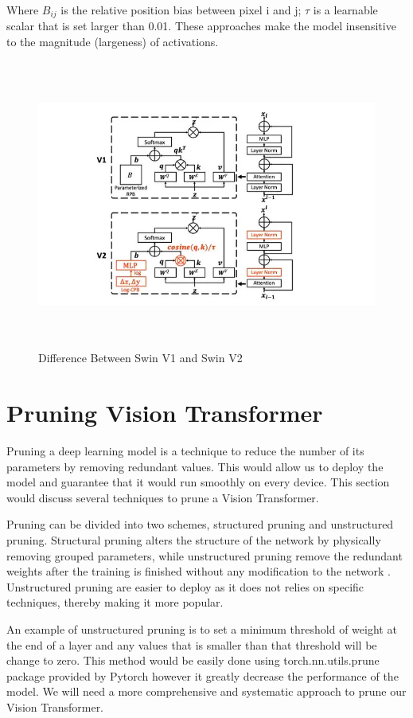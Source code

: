 Where $B_{ij}$ is the relative position bias between pixel i and j; $\tau$ is a learnable scalar that is set larger than 0.01. These approaches make the model insensitive to the magnitude (largeness) of activations.
\FloatBarrier
\begin{figure}[ht]
\includegraphics[width=13.5cm, height=9.5cm]{images/swin1-vs-swin2.jpg}
\centering
\caption{Difference Between Swin V1 and Swin V2 \protect\cite{swin-v2}}
\label{fig:swin v1 vs v2}
\end{figure}
\FloatBarrier

\section{Pruning Vision Transformer}

Pruning a deep learning model is a technique to reduce the number of its parameters by removing redundant values. This would allow us to deploy the model and guarantee that it would run smoothly on every device. This section would discuss several techniques to prune a Vision Transformer.

Pruning can be divided into two schemes, structured pruning and unstructured pruning. Structural pruning alters the structure of the network by physically removing grouped parameters, while unstructured pruning remove the redundant weights after the training is finished without any modification to the network \cite{depgraph}. Unstructured pruning are easier to deploy as it does not relies on specific techniques, thereby making it more popular.

An example of unstructured pruning is to set a minimum threshold of weight at the end of a layer and any values that is smaller than that threshold will be change to zero. This method would be easily done using torch.nn.utils.prune package provided by Pytorch however it greatly decrease the performance of the model. We will need a more comprehensive and systematic approach to prune our Vision Transformer.

